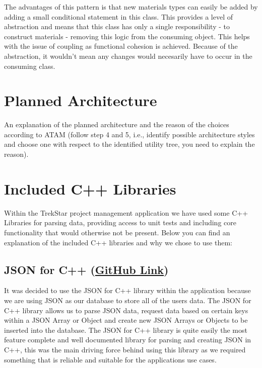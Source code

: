 \documentclass[
  english,
  a4paper,
,tablecaptionabove
]{scrartcl}
\begin{document}
The advantages of this pattern is that new materials types can easily be
added by adding a small conditional statement in this class. This
provides a level of abstraction and means that this class has only a
single responsibility - to construct materials - removing this logic
from the consuming object. This helps with the issue of coupling as
functional cohesion is achieved. Because of the abstraction, it wouldn't
mean any changes would necesarily have to occur in the consuming class.

\newpage

\hypertarget{planned-architecture}{%
\section{Planned Architecture}\label{planned-architecture}}

An explanation of the planned architecture and the reason of the choices
according to ATAM (follow step 4 and 5, i.e., identify possible
architecture styles and choose one with respect to the identified
utility tree, you need to explain the reason).

\newpage

\hypertarget{included-c-libraries}{%
\section{Included C++ Libraries}\label{included-c-libraries}}

Within the TrekStar project management application we have used some C++
Libraries for parsing data, providing access to unit tests and including
core functionality that would otherwise not be present. Below you can
find an explanation of the included C++ libraries and why we chose to
use them:

\hypertarget{json-for-c-github-link}{%
\subsection{\texorpdfstring{JSON for C++
(\href{https://github.com/nlohmann/json}{GitHub
Link})}{JSON for C++ (GitHub Link)}}\label{json-for-c-github-link}}

It was decided to use the JSON for C++ library within the application
because we are using JSON as our database to store all of the users
data. The JSON for C++ library allows us to parse JSON data, request
data based on certain keys within a JSON Array or Object and create new
JSON Arrays or Objects to be inserted into the database. The JSON for
C++ library is quite easily the most feature complete and well
documented library for parsing and creating JSON in C++, this was the
main driving force behind using this library as we required something
that is reliable and suitable for the applications use cases.
\end{document}

